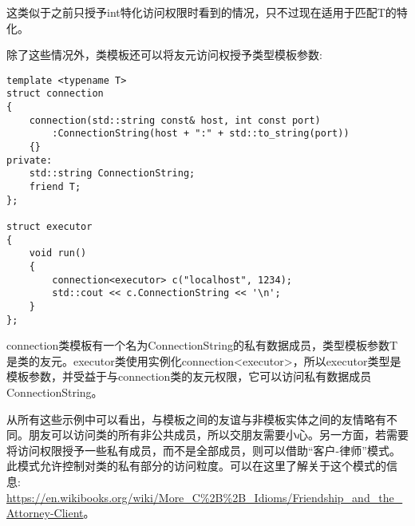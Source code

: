 这类似于之前只授予int特化访问权限时看到的情况，只不过现在适用于匹配T的特化。

除了这些情况外，类模板还可以将友元访问权授予类型模板参数:

\begin{lstlisting}[style=styleCXX]
template <typename T>
struct connection
{
	connection(std::string const& host, int const port)
		:ConnectionString(host + ":" + std::to_string(port))
	{}
private:
	std::string ConnectionString;
	friend T;
};

struct executor
{
	void run()
	{
		connection<executor> c("localhost", 1234);
		std::cout << c.ConnectionString << '\n';
	}
};
\end{lstlisting}

connection类模板有一个名为ConnectionString的私有数据成员，类型模板参数T是类的友元。executor类使用实例化connection<executor>，所以executor类型是模板参数，并受益于与connection类的友元权限，它可以访问私有数据成员ConnectionString。
 
从所有这些示例中可以看出，与模板之间的友谊与非模板实体之间的友情略有不同。朋友可以访问类的所有非公共成员，所以交朋友需要小心。另一方面，若需要将访问权限授予一些私有成员，而不是全部成员，则可以借助“客户-律师”模式。此模式允许控制对类的私有部分的访问粒度。可以在这里了解关于这个模式的信息: \url{https://en.wikibooks.org/wiki/More_C%2B%2B_Idioms/Friendship_and_the_Attorney-Client}。


